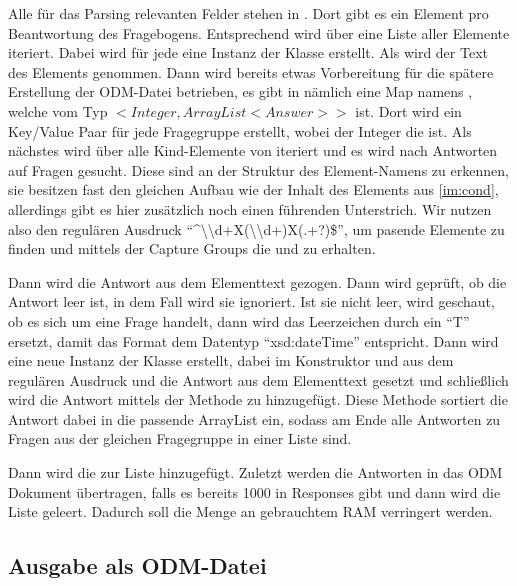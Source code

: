 Alle für das Parsing relevanten Felder stehen in . Dort gibt es ein  Element pro Beantwortung des Fragebogens.
Entsprechend wird über eine Liste aller  Elemente iteriert. Dabei wird für jede  eine Instanz der Klasse  erstellt.
Als  wird der Text des Elements  genommen.
Dann wird bereits etwas Vorbereitung für die spätere Erstellung der ODM-Datei betrieben, es gibt in  nämlich eine Map namens , welche vom Typ $<Integer, ArrayList<Answer>>$ ist.
Dort wird ein Key/Value Paar für jede Fragegruppe erstellt, wobei der Integer die  ist.
Als nächstes wird über alle Kind-Elemente von  iteriert und es wird nach Antworten auf Fragen gesucht.
Diese sind an der Struktur des Element-Namens zu erkennen, sie besitzen fast den gleichen Aufbau wie der Inhalt des Elements  aus \cref{im:cond}, allerdings gibt es hier zusätzlich noch einen führenden Unterstrich.
Wir nutzen also den regulären Ausdruck \enquote{\textasciicircum\textunderscore\textbackslash\textbackslash d+X(\textbackslash\textbackslash d+)X(.+?)\$}, um pasende Elemente zu finden und mittels der Capture Groups die  und  zu erhalten.

Dann wird die Antwort aus dem Elementtext gezogen.
Dann wird geprüft, ob die Antwort leer ist, in dem Fall wird sie ignoriert.
Ist sie nicht leer, wird geschaut, ob es sich um eine  Frage handelt, dann wird das Leerzeichen durch ein \enquote{T} ersetzt, damit das Format dem Datentyp \enquote{xsd:dateTime} entspricht.
Dann wird eine neue Instanz der Klasse  erstellt, dabei im Konstruktor  und  aus dem regulären Ausdruck und die Antwort aus dem Elementtext gesetzt und schließlich wird die Antwort mittels der Methode  zu  hinzugefügt.
Diese Methode sortiert die Antwort dabei in die passende ArrayList ein, sodass am Ende alle Antworten zu Fragen aus der gleichen Fragegruppe in einer Liste sind.

Dann wird die  zur Liste  hinzugefügt.
Zuletzt werden die Antworten in das ODM Dokument übertragen, falls es bereits 1000 in Responses gibt und dann wird die Liste geleert.
Dadurch soll die Menge an gebrauchtem RAM verringert werden.

\subsection{Ausgabe als ODM-Datei}

